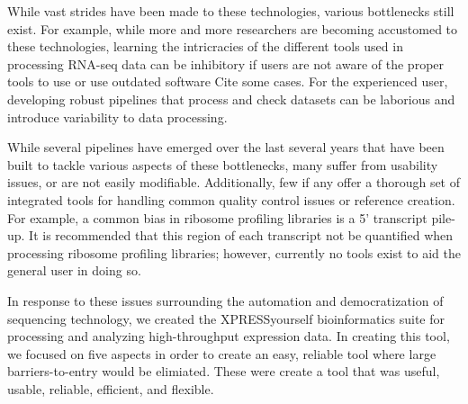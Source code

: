 \documentclass[11pt, a4paper, oneside]{article}
\begin{document}
While vast strides have been made to these technologies, various bottlenecks still exist. For example, while more and more researchers are becoming accustomed to these technologies, learning the intricracies of the different tools used in processing RNA-seq data can be inhibitory if users are not aware of the proper tools to use or use outdated software {Cite some cases}. For the experienced user, developing robust pipelines that process and check datasets can be laborious and introduce variability to data processing.

While several pipelines have emerged over the last several years that have been built to tackle various aspects of these bottlenecks, many suffer from usability issues, or are not easily modifiable. Additionally, few if any offer a thorough set of integrated tools for handling common quality control issues or reference creation. For example, a common bias in ribosome profiling libraries is a 5' transcript pile-up. It is recommended that this region of each transcript not be quantified when processing ribosome profiling libraries; however, currently no tools exist to aid the general user in doing so.

In response to these issues surrounding the automation and democratization of sequencing technology, we created the XPRESSyourself bioinformatics suite for processing and analyzing high-throughput expression data. In creating this tool, we focused on five aspects in order to create an easy, reliable tool where large barriers-to-entry would be elimiated. These were create a tool that was useful, usable, reliable, efficient, and flexible.
\end{document}
